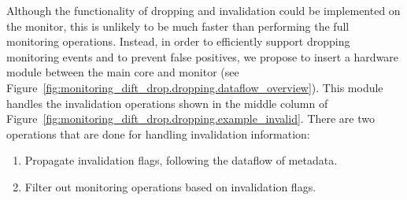 Although the functionality of dropping and invalidation could be implemented on
the monitor, this is unlikely to be much faster than performing the full
monitoring operations.  Instead, in order to efficiently support dropping
monitoring events and to prevent false positives, we propose to insert a
hardware module between the main core and monitor (see
Figure~\ref{fig:monitoring_dift_drop.dropping.dataflow_overview}).  This module
handles the invalidation operations shown in the middle column of
Figure~\ref{fig:monitoring_dift_drop.dropping.example_invalid}.  There are two
operations that are done for handling invalidation information:

\begin{enumerate}
  \item Propagate invalidation flags, following the dataflow of metadata.
  \item Filter out monitoring operations based on invalidation flags.
\end{enumerate}


